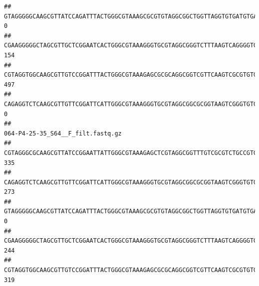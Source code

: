 \documentclass[]{article}
\begin{document}
\begin{verbatim}
## GTAGGGGGCAAGCGTTATCCAGATTTACTGGGCGTAAAGCGCGTGTAGGCGGCTGGTTAGGTGTGATGTGAAATCTTCCGGCTCAACCGGAAAACTGCATTGCAAACCGGCCTGGCTAGAGTGCAGGAGAGGGAAGCGGAATTCCAGGTGTAGCGGTGAAATGCGTAGATATCTGGAGGAACACCAGTGGCGAAGGCGGCTTCCTGGCCTGCAACTGACGCTGAGACGCGAAAGCGTGGGGAGCGAAC                                 0
## CGAAGGGGGCTAGCGTTGCTCGGAATCACTGGGCGTAAAGGGTGCGTAGGCGGGTCTTTAAGTCAGGGGTGAAATCCTGGAGCTCAACTCCAGAACTGCCTTTGATACTGAAGATCTTGAGTTCGGGAGAGGTGAGTGGAACTGCGAGTGTAGAGGTGAAATTCGTAGATATTCGCAAGAACACCAGTGGCGAAGGCGGCTCACTGGCCCGATACTGACGCTGAGGCACGAAAGCGTGGGGAGCAAACA                              154
## CGTAGGTGGCAAGCGTTGTCCGGATTTACTGGGCGTAAAGAGCGCGCAGGCGGTCGTTCAAGTCGCGTGTGAAAGCCCCCGGCTCAACTGGGGAGGGTCACGCGATACTGATCGACTCGAAGGCAGGAGAGGGTAGTGGAATTCCCGGTGTAGTGGTGAAATGCGTAGATATCGGGAGGAACACCAGTGGCGAAGGCGACTACCTGGCCTGTTCTTGACGCTGAGGCGCGAAAGCTAGGGGAGCAAACG                              497
## CAGAGGTCTCAAGCGTTGTTCGGATTCATTGGGCGTAAAGGGTGCGTAGGCGGCGCGGTAAGTCGGGTGTGAAATCTCGGGGCTTAACTCCGAAACTGCATTCGATACTGCCGTGCTTGAGGACTGGAGAGGAGACTGGAATTTACGGTGTAGCGGTGAAATGCGTAGATATCGTAAGGAAGACCAGTGGCGAAGGCGGGTCTCTGGACAGTTCCTGACGCTGAGGCACGAAGGCCAGGGGAGCAAACG                                0
##                                                                                                                                                                                                                                                           064-P4-25-35_S64__F_filt.fastq.gz
## CGTAGGGCGCAAGCGTTATCCGGAATTATTGGGCGTAAAGAGCTCGTAGGCGGTTTGTCGCGTCTGCCGTGAAAGTCCGGGGCTCAACTCCGGATCTGCGGTGGGTACGGGCAGACTAGAGTGATGTAGGGGAGACTGGAATTCCTGGTGTAGCGGTGAAATGCGCAGATATCAGGAGGAACACCGATGGCGAAGGCAGGTCTCTGGGCATTAACTGACGCTGAGGAGCGAAAGCATGGGGAGCGAACA                               335
## CAGAGGTCTCAAGCGTTGTTCGGATTCATTGGGCGTAAAGGGTGCGTAGGCGGCGCGGTAAGTCGGGTGTGAAATCTCGGAGCTTAACTCCGAAACTGCATTCGATACTGCCGTGCTTGAGGACTGGAGAGGAGACTGGAATTTACGGTGTAGCGGTGAAATGCGTAGATATCGTAAGGAAGACCAGTGGCGAAGGCGGGTCTCTGGACAGTTCCTGACGCTGAGGCACGAAGGCCAGGGGAGCAAACG                               273
## GTAGGGGGCAAGCGTTATCCAGATTTACTGGGCGTAAAGCGCGTGTAGGCGGCTGGTTAGGTGTGATGTGAAATCTTCCGGCTCAACCGGAAAACTGCATTGCAAACCGGCCTGGCTAGAGTGCAGGAGAGGGAAGCGGAATTCCAGGTGTAGCGGTGAAATGCGTAGATATCTGGAGGAACACCAGTGGCGAAGGCGGCTTCCTGGCCTGCAACTGACGCTGAGACGCGAAAGCGTGGGGAGCGAAC                                  0
## CGAAGGGGGCTAGCGTTGCTCGGAATCACTGGGCGTAAAGGGTGCGTAGGCGGGTCTTTAAGTCAGGGGTGAAATCCTGGAGCTCAACTCCAGAACTGCCTTTGATACTGAAGATCTTGAGTTCGGGAGAGGTGAGTGGAACTGCGAGTGTAGAGGTGAAATTCGTAGATATTCGCAAGAACACCAGTGGCGAAGGCGGCTCACTGGCCCGATACTGACGCTGAGGCACGAAAGCGTGGGGAGCAAACA                               244
## CGTAGGTGGCAAGCGTTGTCCGGATTTACTGGGCGTAAAGAGCGCGCAGGCGGTCGTTCAAGTCGCGTGTGAAAGCCCCCGGCTCAACTGGGGAGGGTCACGCGATACTGATCGACTCGAAGGCAGGAGAGGGTAGTGGAATTCCCGGTGTAGTGGTGAAATGCGTAGATATCGGGAGGAACACCAGTGGCGAAGGCGACTACCTGGCCTGTTCTTGACGCTGAGGCGCGAAAGCTAGGGGAGCAAACG                               319

\end{verbatim}
\end{document}
